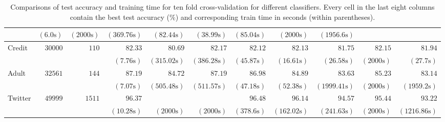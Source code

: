 \documentclass{article}
\begin{document}
\begin{table*}[h]
\begin{center}
\begin{tabular}{|l | r | r |r |r| r |r |r |r| r|r|}
				& $  ( 6.0 \text{s} ) $    & $  (  2000 \text{s}  ) $     & $  ( 369.76 \text{s} ) $    & $  ( 82.44 \text{s} ) $    & $  ( 38.99 \text{s} ) $    & $  ( 85.04 \text{s} ) $    & $  (  2000 \text{s}  ) $     & $  ( 1956.6 \text{s} ) $   \\ \hline
				\multirow{2}{*}{ Credit}   & $  30000 $  & $  110 $  & $   82.33  $    & $   80.69  $    & $   82.17  $    & $   82.12  $    & $   82.13  $    & $   81.75  $    & $   82.15  $    & $   81.94  $   \\ & & 
				& $  ( 7.76 \text{s} ) $    & $  ( 315.02 \text{s} ) $    & $  ( 386.28 \text{s} ) $    & $  ( 45.87 \text{s} ) $    & $  ( 16.61 \text{s} ) $    & $  ( 26.58 \text{s} ) $    & $  (  2000 \text{s}  ) $     & $  ( 27.7 \text{s} ) $   \\ \hline
				\multirow{2}{*}{ Adult}   & $  32561 $  & $  144 $  & $   87.19  $    & $   84.72  $    & $   87.19  $    & $   86.98  $    & $   84.89  $    & $   83.63  $    & $   85.23  $    & $   83.14  $   \\ & & 
				& $  ( 7.07 \text{s} ) $    & $  ( 505.48 \text{s} ) $    & $  ( 511.57 \text{s} ) $    & $  ( 47.18 \text{s} ) $    & $  ( 52.38 \text{s} ) $    & $  ( 1999.41 \text{s} ) $    & $  (  2000 \text{s}  ) $     & $  ( 1959.2 \text{s} ) $   \\ \hline
				\multirow{2}{*}{ Twitter}   & $  49999 $  & $  1511 $  & $   96.37  $    &         &         & $   96.48  $    & $   96.14  $    & $   94.57  $    & $   95.44  $    & $   93.22  $   \\ & & 
				& $  ( 10.28 \text{s} ) $    & $  (  2000 \text{s}  ) $     & $  (  2000 \text{s}  ) $     & $  ( 378.6 \text{s} ) $    & $  ( 162.02 \text{s} ) $    & $  ( 241.63 \text{s} ) $    & $  (  2000 \text{s}  ) $     & $  ( 1216.86 \text{s} ) $   \\ \hline
			\end{tabular}
		\end{center}
		\caption{Comparisons of test accuracy and training time for ten fold cross-validation for different classifiers. Every cell in the last eight columns contain the best test accuracy ($ \% $) and corresponding train time in seconds (within  parentheses).}
	\end{table*}
\end{document}
